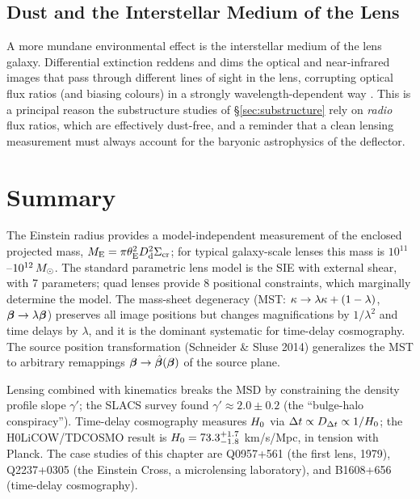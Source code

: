 \subsection{Dust and the Interstellar Medium of the Lens}
\label{sec:lens_dust}

A more mundane environmental effect is the interstellar medium of
the lens galaxy.  Differential extinction reddens and dims the optical
and near-infrared images that pass through different lines of sight in
the lens, corrupting optical flux ratios (and biasing colours) in a
strongly wavelength-dependent way
\citep[][Part~2, \S9]{schneider_kochanek_wambsganss_2006}.  This is a
principal reason the substructure studies of \S\ref{sec:substructure}
rely on \emph{radio} flux ratios, which are effectively dust-free, and a
reminder that a clean lensing measurement must always account for the
baryonic astrophysics of the deflector.


\section{Summary}
\label{sec:galaxy_lensing_summary}

The Einstein radius provides a model-independent measurement of the
enclosed projected mass, $M_{\mathrm{E}} = \pi\theta_{\mathrm{E}}^2 D_{\mathrm{d}}^2 \Sigma_{\mathrm{cr}}$;
for typical galaxy-scale lenses this mass is
$10^{11}$--$10^{12}\,M_{\odot}$.  The standard parametric lens model is
the SIE with external shear, with 7 parameters; quad lenses provide
8 positional constraints, which marginally determine the model.  The
mass-sheet degeneracy (MST: $\kappa \to \lambda\kappa + (1-\lambda)$,
$\boldsymbol{\beta} \to \lambda\boldsymbol{\beta}$) preserves all image positions but
changes magnifications by $1/\lambda^2$ and time delays by
$\lambda$, and it is the dominant systematic for time-delay
cosmography.  The source position transformation (Schneider \&
Sluse 2014) generalizes the MST to arbitrary remappings
$\boldsymbol{\beta} \to \hat{\boldsymbol{\beta}}(\boldsymbol{\beta})$ of the source plane.

Lensing combined with kinematics breaks the MSD by constraining the
density profile slope $\gamma'$; the SLACS survey found
$\gamma' \approx 2.0 \pm 0.2$ (the ``bulge-halo conspiracy'').
Time-delay cosmography measures $H_0$ via
$\Delta t \propto D_{\Delta t} \propto 1/H_0$; the
H0LiCOW/TDCOSMO result is $H_0 = 73.3^{+1.7}_{-1.8}$ km/s/Mpc,
in tension with Planck.  The case studies of this chapter are
Q0957+561 (the first lens, 1979), Q2237+0305 (the Einstein Cross, a
microlensing laboratory), and B1608+656 (time-delay cosmography).


